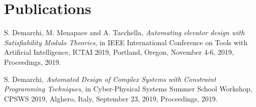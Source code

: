 \section{\sc Publications}

S. Demarchi, M. Menapace and A. Tacchella, \textit{Automating elevator design with
	Satisfiability Modulo Theories}, in IEEE International Conference on Tools with 
Artificial Intelligence, ICTAI 2019, Portland, Oregon, November 4-6, 2019, 
Proceedings, 2019.

S. Demarchi, \textit{Automated Design of Complex Systems with Constraint Programming
	Techniques}, in Cyber-Physical Systems Summer School Workshop, CPSWS 2019,
Alghero, Italy, September 23, 2019, Proceedings, 2019.